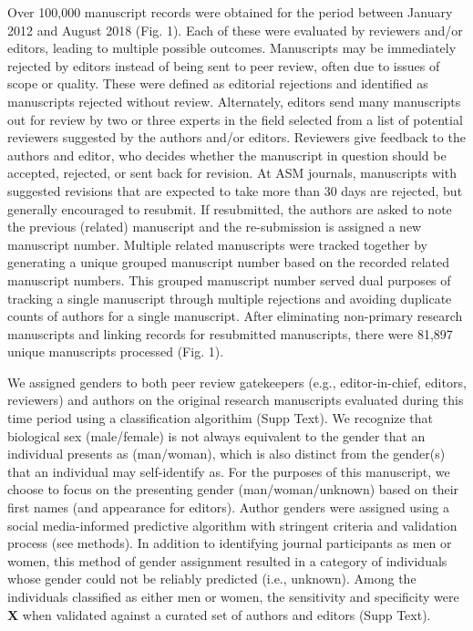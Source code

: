 \documentclass[11pt,]{article}
\begin{document}
Over 100,000 manuscript records were obtained for the period between
January 2012 and August 2018 (Fig. 1). Each of these were evaluated by
reviewers and/or editors, leading to multiple possible outcomes.
Manuscripts may be immediately rejected by editors instead of being sent
to peer review, often due to issues of scope or quality. These were
defined as editorial rejections and identified as manuscripts rejected
without review. Alternately, editors send many manuscripts out for
review by two or three experts in the field selected from a list of
potential reviewers suggested by the authors and/or editors. Reviewers
give feedback to the authors and editor, who decides whether the
manuscript in question should be accepted, rejected, or sent back for
revision. At ASM journals, manuscripts with suggested revisions that are
expected to take more than 30 days are rejected, but generally
encouraged to resubmit. If resubmitted, the authors are asked to note
the previous (related) manuscript and the re-submission is assigned a
new manuscript number. Multiple related manuscripts were tracked
together by generating a unique grouped manuscript number based on the
recorded related manuscript numbers. This grouped manuscript number
served dual purposes of tracking a single manuscript through multiple
rejections and avoiding duplicate counts of authors for a single
manuscript. After eliminating non-primary research manuscripts and
linking records for resubmitted manuscripts, there were 81,897 unique
manuscripts processed (Fig. 1).

We assigned genders to both peer review gatekeepers (e.g.,
editor-in-chief, editors, reviewers) and authors on the original
research manuscripts evaluated during this time period using a
classification algorithim (Supp Text). We recognize that biological sex
(male/female) is not always equivalent to the gender that an individual
presents as (man/woman), which is also distinct from the gender(s) that
an individual may self-identify as. For the purposes of this manuscript,
we choose to focus on the presenting gender (man/woman/unknown) based on
their first names (and appearance for editors). Author genders were
assigned using a social media-informed predictive algorithm with
stringent criteria and validation process (see methods). In addition to
identifying journal participants as men or women, this method of gender
assignment resulted in a category of individuals whose gender could not
be reliably predicted (i.e., unknown). Among the individuals classified
as either men or women, the sensitivity and specificity were \textbf{X}
when validated against a curated set of authors and editors (Supp Text).
\end{document}
